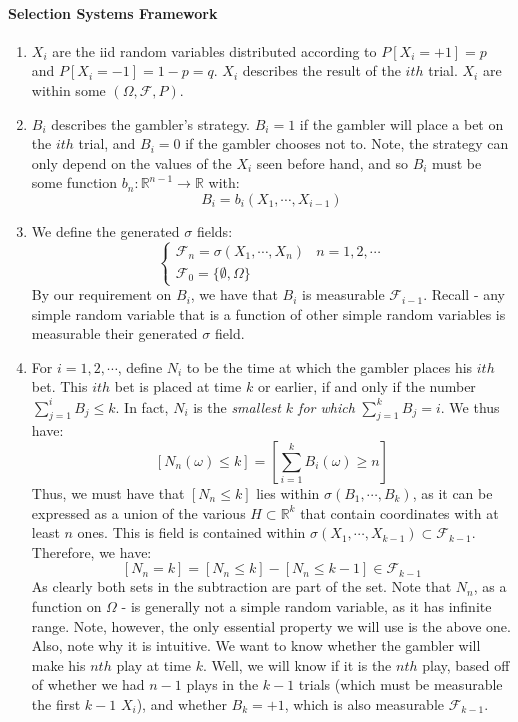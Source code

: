 \documentclass[12pt,a4paper]{article}
\newcommand{\1}[1]{\mathbbm{1}\left\{ #1 \right\}}
\newcommand{\R}{\mathbb{R}}
\newcommand{\fcal}{\mathcal{F}}
\begin{document}
\paragraph{Selection Systems Framework}
\begin{enumerate}
	\item $X_i$ are the iid random variables distributed according to $P[X_i = +1] = p$ and $P[X_i = -1] = 1 - p = q$. $X_i$ describes the result of the $ith$ trial. $X_i$ are within some $(\Omega, \fcal, P)$.
	
	\item $B_i$ describes the gambler's strategy. $B_i = 1$ if the gambler will place a bet on the $ith$ trial, and $B_i = 0$ if the gambler chooses not to. Note, the strategy can only depend on the values of the $X_i$ seen before hand, and so $B_i$ must be some function $b_n: \R^{n-1} \to \R$ with:
	$$
		B_i = b_i(X_1, \cdots, X_{i-1})
	$$
	
	\item We define the generated $\sigma$ fields:
	$$
		\begin{cases}
		\fcal_n = \sigma(X_1, \cdots, X_n) & n = 1, 2, \cdots\\
		\fcal_0 = \{\emptyset, \Omega\}
		\end{cases}
	$$
	By our requirement on $B_i$, we have that $B_i$ is measurable $\fcal_{i-1}$. Recall - any simple random variable that is a function of other simple random variables is measurable their generated $\sigma$ field.
	
	\item For $i = 1, 2, \cdots$, define $N_i$ to be the time at which the gambler places his $ith$ bet. This $ith$ bet is placed at time $k$ or earlier, if and only if the number $\sum_{j=1}^i B_j \leq k$. In fact, $N_i$ is the \textit{smallest $k$ for which} $\sum_{j=1}^k B_j = i$. We thus have:
	$$
		[N_n(\omega) \leq k] = \left[\sum_{i=1}^k B_i(\omega) \geq n\right]
	$$
	Thus, we must have that $[N_n \leq k]$ lies within $\sigma(B_1, \cdots, B_k)$, as it can be expressed as a union of the various $H \subset \R^k$ that contain coordinates with at least $n$ ones. This is field is contained within  $\sigma(X_1, \cdots, X_{k-1}) \subset \fcal_{k-1}$. Therefore, we have:
	$$
		[N_n = k] = [N_n \leq k] - [N_n \leq k - 1] \in \fcal_{k-1}
	$$
	As clearly both sets in the subtraction are part of the set. Note that $N_n$, as a function on $\Omega$ - is generally not a simple random variable, as it has infinite range. Note, however, the only essential property we will use is the above one. Also, note why it is intuitive. We want to know whether the gambler will make his $nth$ play at time $k$. Well, we will know if it is the $nth$ play, based off of whether we had $n - 1$ plays in the $k - 1$ trials (which must be measurable the first $k - 1$ $X_i$), and whether $B_k = +1$, which is also measurable $\fcal_{k-1}$.
	

\end{enumerate}
\end{document}

